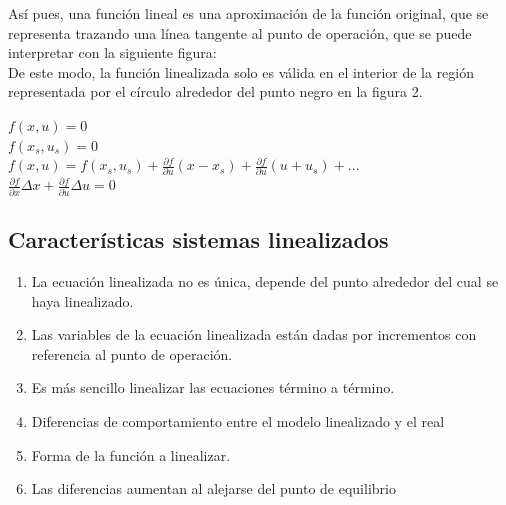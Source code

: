 \documentclass[a4paper,12pt,twoside]{proyectotanquesecci}
\begin{document}
Así pues, una función lineal es una aproximación de la función original, que se representa trazando una línea tangente al punto de operación, que se puede interpretar con la siguiente figura:\\


De este modo, la función linealizada solo es válida en el interior de la región representada por el círculo alrededor del punto negro en la figura 2.\\

\begin{center}
	$f\left( x,u\right)=0$\\
	$f\left( x_{s},u_{s}\right) =0$\\
	$f\left( x,u\right) = f\left( x_{s},u_{s}\right) +\frac {\partial f}{\partial u}\left( x-x_{s}\right) +\frac {\partial f}{\partial u}\left( u+u_{s}\right) +\ldots$\\
	$\frac {\partial f}{\partial x}\Delta x+\frac {\partial f}{\partial u}\Delta u=0$
\end{center}

\subsection{Características sistemas linealizados}

\begin{enumerate}
\item La ecuación linealizada no es única, depende del punto alrededor del cual se haya linealizado.
\item Las variables de la ecuación linealizada están dadas por incrementos con referencia al punto de operación.
\item Es más sencillo linealizar las ecuaciones término a término.
\item Diferencias de comportamiento entre el modelo linealizado y el real
\item Forma de la función a linealizar.
\item Las diferencias aumentan al alejarse del punto de equilibrio 
\end{enumerate}
\end{document}
